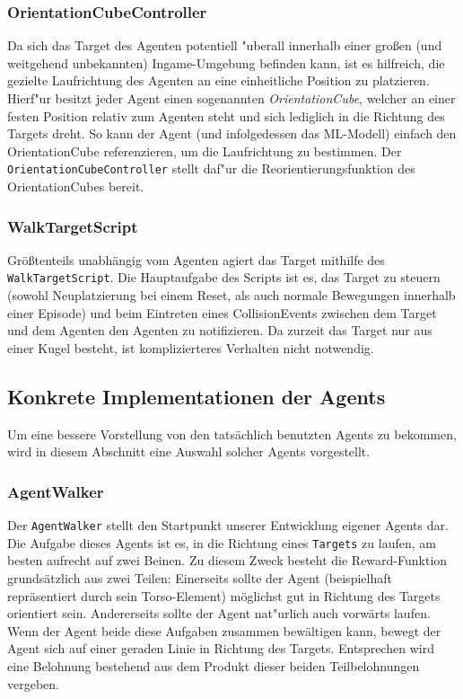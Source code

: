 \subsubsection{OrientationCubeController}

Da sich das Target des Agenten potentiell "uberall innerhalb einer großen (und weitgehend unbekannten) Ingame-Umgebung befinden kann, ist es hilfreich, die gezielte Laufrichtung des Agenten an eine einheitliche Position zu platzieren. Hierf"ur besitzt jeder Agent einen sogenannten \textit{OrientationCube}, welcher an einer festen Position relativ zum Agenten steht und sich lediglich in die Richtung des Targets dreht. So kann der Agent (und infolgedessen das ML-Modell) einfach den OrientationCube referenzieren, um die Laufrichtung zu bestimmen. Der \texttt{OrientationCubeController} stellt daf"ur die Reorientierungsfunktion des OrientationCubes bereit.


\subsubsection{WalkTargetScript}

Größtenteils unabhängig vom Agenten agiert das Target mithilfe des \texttt{WalkTargetScript}. Die Hauptaufgabe des Scripts ist es, das Target zu steuern (sowohl Neuplatzierung bei einem Reset, als auch normale Bewegungen innerhalb einer Episode) und beim Eintreten eines CollisionEvents zwischen dem Target und dem Agenten den Agenten zu notifizieren. Da zurzeit das Target nur aus einer Kugel besteht, ist komplizierteres Verhalten nicht notwendig.

\subsection{Konkrete Implementationen der Agents}
\label{sec:konkretAgents}

Um eine bessere Vorstellung von den tatsächlich benutzten Agents zu bekommen, wird in diesem Abschnitt eine Auswahl solcher Agents vorgestellt. 

\subsubsection{AgentWalker}

Der \texttt{AgentWalker} stellt den Startpunkt unserer Entwicklung eigener Agents dar. Die Aufgabe dieses Agents ist es, in die Richtung eines \texttt{Targets} zu laufen, am besten aufrecht auf zwei Beinen. Zu diesem Zweck besteht die Reward-Funktion grundsätzlich aus zwei Teilen: Einerseits sollte der Agent (beispielhaft repräsentiert durch sein Torso-Element) möglichst gut in Richtung des Targets orientiert sein. Andererseits sollte der Agent nat"urlich auch vorwärts laufen. Wenn der Agent beide diese Aufgaben zusammen bewältigen kann, bewegt der Agent sich auf einer geraden Linie in Richtung des Targets. Entsprechen wird eine Belohnung bestehend aus dem Produkt dieser beiden Teilbelohnungen vergeben.


